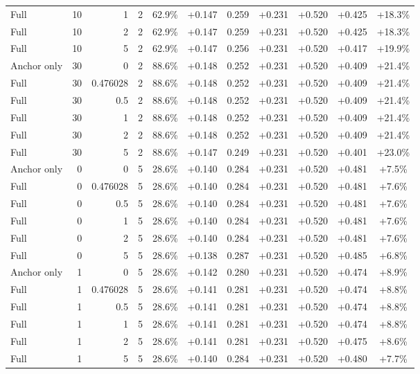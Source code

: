 \begin{table}[htbp]
\begin{tabular}{lrrrccccccc}
Full & 10 & 1 & 2 & 62.9\% & +0.147 & 0.259 & +0.231 & +0.520 & +0.425 & +18.3\% \\
Full & 10 & 2 & 2 & 62.9\% & +0.147 & 0.259 & +0.231 & +0.520 & +0.425 & +18.3\% \\
Full & 10 & 5 & 2 & 62.9\% & +0.147 & 0.256 & +0.231 & +0.520 & +0.417 & +19.9\% \\
Anchor only & 30 & 0 & 2 & 88.6\% & +0.148 & 0.252 & +0.231 & +0.520 & +0.409 & +21.4\% \\
Full & 30 & 0.476028 & 2 & 88.6\% & +0.148 & 0.252 & +0.231 & +0.520 & +0.409 & +21.4\% \\
Full & 30 & 0.5 & 2 & 88.6\% & +0.148 & 0.252 & +0.231 & +0.520 & +0.409 & +21.4\% \\
Full & 30 & 1 & 2 & 88.6\% & +0.148 & 0.252 & +0.231 & +0.520 & +0.409 & +21.4\% \\
Full & 30 & 2 & 2 & 88.6\% & +0.148 & 0.252 & +0.231 & +0.520 & +0.409 & +21.4\% \\
Full & 30 & 5 & 2 & 88.6\% & +0.147 & 0.249 & +0.231 & +0.520 & +0.401 & +23.0\% \\
Anchor only & 0 & 0 & 5 & 28.6\% & +0.140 & 0.284 & +0.231 & +0.520 & +0.481 & +7.5\% \\
Full & 0 & 0.476028 & 5 & 28.6\% & +0.140 & 0.284 & +0.231 & +0.520 & +0.481 & +7.6\% \\
Full & 0 & 0.5 & 5 & 28.6\% & +0.140 & 0.284 & +0.231 & +0.520 & +0.481 & +7.6\% \\
Full & 0 & 1 & 5 & 28.6\% & +0.140 & 0.284 & +0.231 & +0.520 & +0.481 & +7.6\% \\
Full & 0 & 2 & 5 & 28.6\% & +0.140 & 0.284 & +0.231 & +0.520 & +0.481 & +7.6\% \\
Full & 0 & 5 & 5 & 28.6\% & +0.138 & 0.287 & +0.231 & +0.520 & +0.485 & +6.8\% \\
Anchor only & 1 & 0 & 5 & 28.6\% & +0.142 & 0.280 & +0.231 & +0.520 & +0.474 & +8.9\% \\
Full & 1 & 0.476028 & 5 & 28.6\% & +0.141 & 0.281 & +0.231 & +0.520 & +0.474 & +8.8\% \\
Full & 1 & 0.5 & 5 & 28.6\% & +0.141 & 0.281 & +0.231 & +0.520 & +0.474 & +8.8\% \\
Full & 1 & 1 & 5 & 28.6\% & +0.141 & 0.281 & +0.231 & +0.520 & +0.474 & +8.8\% \\
Full & 1 & 2 & 5 & 28.6\% & +0.141 & 0.281 & +0.231 & +0.520 & +0.475 & +8.6\% \\
Full & 1 & 5 & 5 & 28.6\% & +0.140 & 0.284 & +0.231 & +0.520 & +0.480 & +7.7\% \\

\end{tabular}
\end{table}

